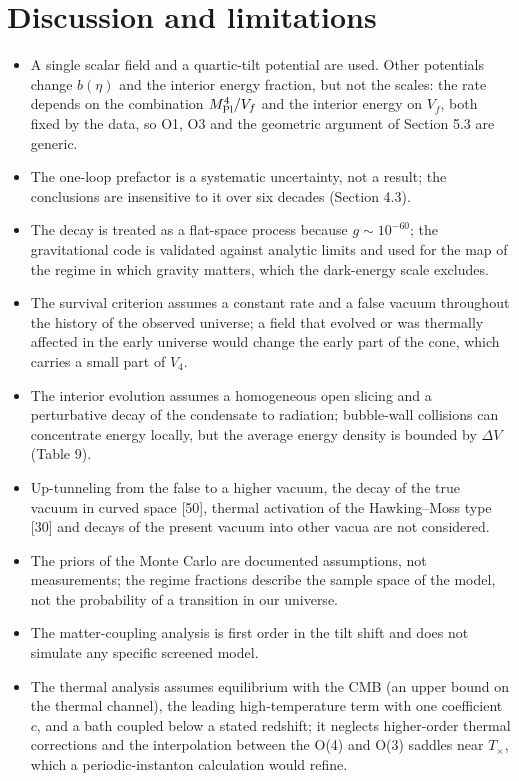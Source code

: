 \documentclass[11pt,a4paper]{article}
\begin{document}
\section{Discussion and limitations}
\begin{itemize}\item A single scalar field and a quartic-tilt potential are used. Other potentials change $b(\eta)$ and the interior energy fraction, but not the scales: the rate depends on the combination $M_{\rm Pl}^4/V_f$ and the interior energy on $V_f$, both fixed by the data, so O1, O3 and the geometric argument of Section 5.3 are generic.
\item The one-loop prefactor is a systematic uncertainty, not a result; the conclusions are insensitive to it over six decades (Section 4.3).
\item The decay is treated as a flat-space process because $g\sim10^{-60}$; the gravitational code is validated against analytic limits and used for the map of the regime in which gravity matters, which the dark-energy scale excludes.
\item The survival criterion assumes a constant rate and a false vacuum throughout the history of the observed universe; a field that evolved or was thermally affected in the early universe would change the early part of the cone, which carries a small part of $V_4$.
\item The interior evolution assumes a homogeneous open slicing and a perturbative decay of the condensate to radiation; bubble-wall collisions can concentrate energy locally, but the average energy density is bounded by $\Delta V$ (Table 9).
\item Up-tunneling from the false to a higher vacuum, the decay of the true vacuum in curved space [50], thermal activation of the Hawking--Moss type [30] and decays of the present vacuum into other vacua are not considered.
\item The priors of the Monte Carlo are documented assumptions, not measurements; the regime fractions describe the sample space of the model, not the probability of a transition in our universe.
\item The matter-coupling analysis is first order in the tilt shift and does not simulate any specific screened model.
\item The thermal analysis assumes equilibrium with the CMB (an upper bound on the thermal channel), the leading high-temperature term with one coefficient $c$, and a bath coupled below a stated redshift; it neglects higher-order thermal corrections and the interpolation between the O(4) and O(3) saddles near $T_\times$, which a periodic-instanton calculation would refine.

\end{itemize}
\end{document}
